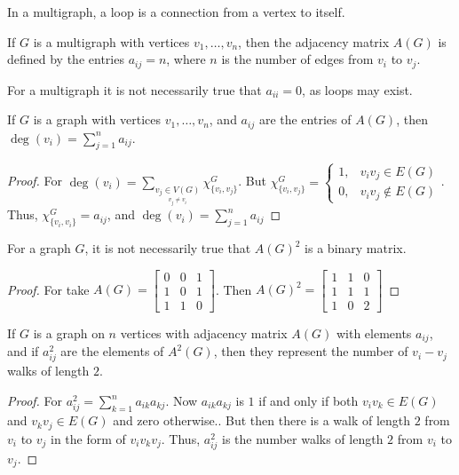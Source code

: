     \begin{definition}
    In a multigraph, a loop is a connection from a vertex to itself.
    \end{definition}
    \begin{definition}
    If $G$ is a multigraph with vertices $v_1,\hdots, v_n$, then the adjacency matrix $A(G)$ is defined by the entries $a_{ij} = n$, where $n$ is the number of edges from $v_i$ to $v_j$. 
    \end{definition}
    For a multigraph it is not necessarily true that $a_{ii}=0$, as
    loops may exist.
    \begin{theorem}
    If $G$ is a graph with vertices $v_1,\hdots, v_n$, and $a_{ij}$ are the entries of $A(G)$, then $\deg(v_i) = \sum_{j=1}^{n} a_{ij}$.
    \end{theorem}
    \begin{proof}
    For $\deg(v_i) = \sum_{\underset{v_j\ne v_i}{v_j\in V(G)}}\chi_{\{v_i,v_j\}}^G$. But $\chi_{\{v_i,v_j\}}^G = \begin{cases} 1, & v_iv_j\in E(G)\\ 0, & v_iv_j \notin E(G)\end{cases}$. Thus, $\chi_{\{v_i,v_i\}}^G = a_{ij}$, and $\deg(v_i) = \sum_{j=1}^{n} a_{ij}$
    \end{proof}
    \begin{theorem}
    For a graph $G$, it is not necessarily true that $A(G)^2$ is a binary matrix.
    \end{theorem}
    \begin{proof}
    For take $A(G) = \begin{bmatrix} 0 & 0 & 1 \\ 1 & 0 & 1 \\ 1& 1 & 0 \end{bmatrix}$. Then $A(G)^2 = \begin{bmatrix} 1 & 1 & 0 \\ 1 & 1 & 1 \\ 1 & 0 & 2 \end{bmatrix}$
    \end{proof}
    \begin{theorem}
    If $G$ is a graph on $n$ vertices with adjacency matrix $A(G)$ with elements $a_{ij}$, and if $a^2_{ij}$ are the elements of $A^2(G)$, then they represent the number of $v_{i}-v_{j}$ walks of length $2$.
    \end{theorem}
    \begin{proof}
    For $a^2_{ij} = \sum_{k=1}^{n} a_{ik}a_{kj}$. Now $a_{ik}a_{kj}$ is $1$ if and only if both $v_iv_k \in E(G)$ and $v_kv_j \in E(G)$ and zero otherwise.. But then there is a walk of length $2$ from $v_i$ to $v_j$ in the form of $v_i v_k v_j$. Thus, $a^2_{ij}$ is the number walks of length $2$ from $v_i$ to $v_j$.
    \end{proof} 
